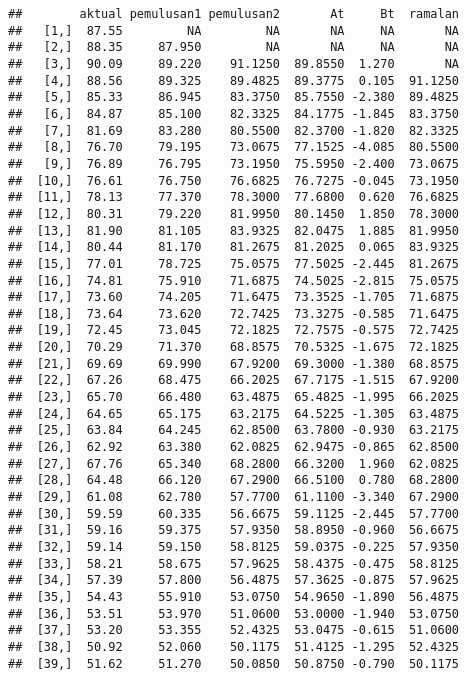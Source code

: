 \documentclass[
]{article}
\begin{document}
\begin{verbatim}
##        aktual pemulusan1 pemulusan2       At     Bt  ramalan
##   [1,]  87.55         NA         NA       NA     NA       NA
##   [2,]  88.35     87.950         NA       NA     NA       NA
##   [3,]  90.09     89.220    91.1250  89.8550  1.270       NA
##   [4,]  88.56     89.325    89.4825  89.3775  0.105  91.1250
##   [5,]  85.33     86.945    83.3750  85.7550 -2.380  89.4825
##   [6,]  84.87     85.100    82.3325  84.1775 -1.845  83.3750
##   [7,]  81.69     83.280    80.5500  82.3700 -1.820  82.3325
##   [8,]  76.70     79.195    73.0675  77.1525 -4.085  80.5500
##   [9,]  76.89     76.795    73.1950  75.5950 -2.400  73.0675
##  [10,]  76.61     76.750    76.6825  76.7275 -0.045  73.1950
##  [11,]  78.13     77.370    78.3000  77.6800  0.620  76.6825
##  [12,]  80.31     79.220    81.9950  80.1450  1.850  78.3000
##  [13,]  81.90     81.105    83.9325  82.0475  1.885  81.9950
##  [14,]  80.44     81.170    81.2675  81.2025  0.065  83.9325
##  [15,]  77.01     78.725    75.0575  77.5025 -2.445  81.2675
##  [16,]  74.81     75.910    71.6875  74.5025 -2.815  75.0575
##  [17,]  73.60     74.205    71.6475  73.3525 -1.705  71.6875
##  [18,]  73.64     73.620    72.7425  73.3275 -0.585  71.6475
##  [19,]  72.45     73.045    72.1825  72.7575 -0.575  72.7425
##  [20,]  70.29     71.370    68.8575  70.5325 -1.675  72.1825
##  [21,]  69.69     69.990    67.9200  69.3000 -1.380  68.8575
##  [22,]  67.26     68.475    66.2025  67.7175 -1.515  67.9200
##  [23,]  65.70     66.480    63.4875  65.4825 -1.995  66.2025
##  [24,]  64.65     65.175    63.2175  64.5225 -1.305  63.4875
##  [25,]  63.84     64.245    62.8500  63.7800 -0.930  63.2175
##  [26,]  62.92     63.380    62.0825  62.9475 -0.865  62.8500
##  [27,]  67.76     65.340    68.2800  66.3200  1.960  62.0825
##  [28,]  64.48     66.120    67.2900  66.5100  0.780  68.2800
##  [29,]  61.08     62.780    57.7700  61.1100 -3.340  67.2900
##  [30,]  59.59     60.335    56.6675  59.1125 -2.445  57.7700
##  [31,]  59.16     59.375    57.9350  58.8950 -0.960  56.6675
##  [32,]  59.14     59.150    58.8125  59.0375 -0.225  57.9350
##  [33,]  58.21     58.675    57.9625  58.4375 -0.475  58.8125
##  [34,]  57.39     57.800    56.4875  57.3625 -0.875  57.9625
##  [35,]  54.43     55.910    53.0750  54.9650 -1.890  56.4875
##  [36,]  53.51     53.970    51.0600  53.0000 -1.940  53.0750
##  [37,]  53.20     53.355    52.4325  53.0475 -0.615  51.0600
##  [38,]  50.92     52.060    50.1175  51.4125 -1.295  52.4325
##  [39,]  51.62     51.270    50.0850  50.8750 -0.790  50.1175

\end{verbatim}
\end{document}
